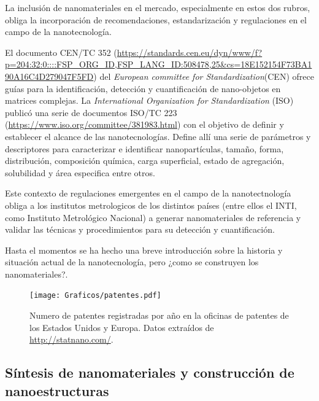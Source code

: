  	 La inclusión de nanomateriales en el mercado, especialmente en estos dos rubros, obliga la incorporación de recomendaciones, estandarización y regulaciones en el campo de la nanotecnología.  

 	 El documento CEN/TC 352 (\url{https://standards.cen.eu/dyn/www/f?p=204:32:0::::FSP_ORG_ID,FSP_LANG_ID:508478,25&cs=18E152154F73BA190A16C4D279047F5FD}) del \textit{European committee for Standardization}(CEN) ofrece guías para la identificación, detección y cuantificación de nano-objetos en matrices complejas. La \textit{International Organization for Standardization} (ISO) publicó una serie de documentos ISO/TC 223 (\url{https://www.iso.org/committee/381983.html}) con el objetivo de definir y establecer el alcance de las nanotecnologías. Define allí una serie de parámetros y descriptores para caracterizar e identificar nanopartículas, tamaño, forma, distribución, composición química, carga superficial, estado de agregación, solubilidad y área especifica entre otros.

 	 Este contexto de regulaciones emergentes en el campo de la nanotectnología obliga a los institutos metrologicos de los distintos países (entre ellos el INTI, como Instituto Metrológico Nacional) a generar nanomateriales de referencia y validar las técnicas y procedimientos para su detección y cuantificación.

 	 Hasta el momentos se ha hecho una breve introducción sobre la historia y situación actual de la nanotecnología, pero ¿como se construyen los nanomateriales?.


		\begin{figure}[h!]
 			\begin{center}
 			\texttt{[image: Graficos/patentes.pdf]}
 			\vspace*{-0.3cm}
 			\caption[Número de patentes de productos en base nanotecnológica]{Numero de patentes registradas por año en la oficinas de patentes de los Estados Unidos y Europa. Datos extraídos de \url{http://statnano.com/}.}
 			\label{fig:patentes}
 		    \end{center}
 		    \end{figure}

 	\vspace*{-0.6cm}\subsection{Síntesis de nanomateriales y construcción de nanoestructuras}

